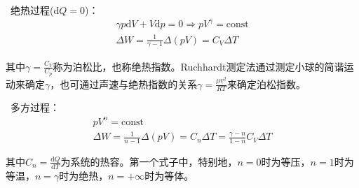 \documentclass[zihao=-4,UTF8]{report}
\begin{document}
\par
{}\ 绝热过程($\mathrm{d}Q = 0$)：
\begin{gather}
    \gamma p \mathrm{d}V + V\mathrm{d}p = 0 \Longrightarrow p V^{\gamma} = \text{const}\\
    \Delta W = \frac{1}{\gamma -1}\Delta \left(pV\right) = C_V\Delta T
\end{gather}\par
{\color{gray}\small 其中$\gamma = \frac{C_V}{C_p}$称为泊松比，也称绝热指数。Ruchhardt测定法通过测定小球的简谐运动来确定$\gamma$，也可通过声速与绝热指数的关系$\gamma = \frac{\mu v^2}{RT}$来确定泊松指数。}
\par
{}\ 多方过程：
\begin{gather}
    pV^n = \text{const}\\
    \Delta W = \frac{1}{n-1}\Delta \left(pV\right) = C_n\Delta T = \frac{\gamma-n}{1-n}C_V\Delta T
\end{gather}\par
{\color{gray}\small 其中$C_n = \frac{\mathrm{d} Q}{\mathrm{d} T}$为系统的热容。第一个式子中，特别地，$n=0$时为等压，$n=1$时为等温，$n=\gamma$时为绝热，$n=+\infty$时为等体。}
\par
\end{document}
